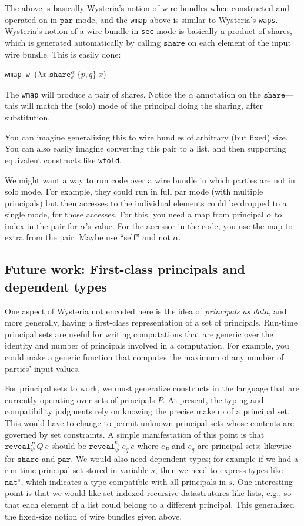 \documentclass[10pt]{article}
\newcommand{\kw}[1]{\ensuremath{\mathtt{#1}}}
\newcommand{\tnat}{\ensuremath{\mathtt{nat}}}
\newcommand{\ereveal}[4]{\ensuremath{\kw{reveal}^{#1}_{#4}~{#2}~{#3}}}
\newcommand{\eshare}[4]{\ensuremath{\kw{share}^{#2}_{#1}~{#3}~{#4}}}
\newcommand{\elam}[2]{\ensuremath{\lambda {#1}.{#2}}}
\begin{document}
The above is basically Wysteria's notion of wire bundles when
constructed and operated on in $\kw{par}$ mode, and the \texttt{wmap}
above is similar to Wysteria's \texttt{waps}. Wysteria's notion of a
wire bundle in \texttt{sec} mode is basically a product of
shares, which is generated automatically by calling $\kw{share}$ on
each element of the input wire bundle. This is easily done:

\bigskip
\noindent
\texttt{wmap w }($\elam{x}{\eshare{\phi}{\alpha}{\{p,q\}}{x}}$)
\bigskip

\noindent
The \texttt{wmap} will produce a pair of shares. Notice the
$\alpha$ annotation on the $\kw{share}$---this will match the (solo)
mode of the principal doing the sharing, after substitution.

You can imagine generalizing this to wire bundles of arbitrary (but
fixed) size. You can also easily imagine converting this pair to a
list, and then supporting equivalent constructs like \texttt{wfold}.

We might want a way to run code over a wire bundle in which parties
are not in solo mode. For example, they could run in full par mode
(with multiple principals) but then accesses to the individual elements
could be dropped to a single mode, for those accesses. For this, you
need a map from principal $\alpha$ to index in the pair for $\alpha$'s
value. For the accessor in the code, you use the map to extra from the
pair. Maybe use ``self'' and not $\alpha$.

\subsection{Future work: First-class principals and dependent types}

One aspect of Wysteria not encoded here is the idea of
\emph{principals as data}, and more generally, having a first-class
representation of a set of principals. Run-time principal sets are
useful for writing computations that are generic over the identity and
number of principals involved in a computation. For example, you could
make a generic function that computes the maximum of any number of
parties' input values.

For principal sets to work, we must generalize constructs in the
language that are currently operating over sets of principals $P$. At
present, the typing and compatibility judgments rely on knowing the
precise makeup of a principal set. This would have to change to permit
unknown principal sets whose contents are governed by set
constraints. A simple manifestation of this point is that
$\ereveal{P}{Q}{e}{\psi}$ should be $\ereveal{e_q}{e_q}{e}{\psi}$
where $e_P$ and $e_q$ are principal sets; likewise for $\kw{share}$
and $\kw{par}$. We would also need dependent types; for example if we
had a run-time principal set stored in variable $s$, then we need to
express types like $\tnat^s$, which indicates a type compatible with
all principals in $s$. One interesting point is that we would like
set-indexed recursive datastrutures like lists, e.g., so that each
element of a list could belong to a different principal. This
generalized the fixed-size notion of wire bundles given above.
\end{document}
